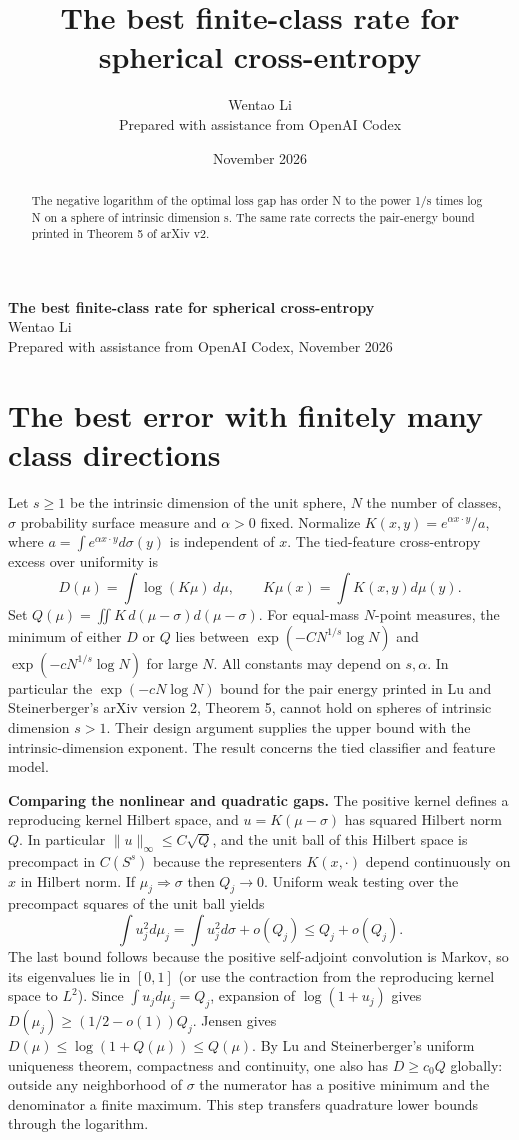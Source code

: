 \documentclass[11pt]{article}
\title{The best finite-class rate for spherical cross-entropy}
\author{Wentao Li\\{\small Prepared with assistance from OpenAI Codex}}
\date{November 2026}
\begin{document}
\begin{center}{\Large\bfseries The best finite-class rate for spherical cross-entropy}\\[3pt]Wentao Li\\{\small Prepared with assistance from OpenAI Codex, November 2026}\end{center}
\begin{abstract}
The negative logarithm of the optimal loss gap has order N to the power 1/s times log N on a sphere of intrinsic dimension s. The same rate corrects the pair-energy bound printed in Theorem 5 of arXiv v2.
\end{abstract}
\section*{The best error with finitely many class directions}
Let $s\ge1$ be the intrinsic dimension of the unit sphere, $N$ the number of classes, $\sigma$ probability surface measure and $\alpha>0$ fixed. Normalize $K(x,y)=e^{\alpha x\cdot y}/a$, where $a=\int e^{\alpha x\cdot y}d\sigma(y)$ is independent of $x$. The tied-feature cross-entropy excess over uniformity is
\[
 D(\mu)=\int\log(K\mu)\,d\mu,\qquad K\mu(x)=\int K(x,y)d\mu(y).
\]
Set $Q(\mu)=\iint K\,d(\mu-\sigma)d(\mu-\sigma)$. For equal-mass $N$-point measures, the minimum of either $D$ or $Q$ lies between $\exp(-C N^{1/s}\log N)$ and $\exp(-c N^{1/s}\log N)$ for large $N$. All constants may depend on $s,\alpha$. In particular the $\exp(-cN\log N)$ bound for the pair energy printed in Lu and Steinerberger's arXiv version 2, Theorem 5, cannot hold on spheres of intrinsic dimension $s>1$. Their design argument supplies the upper bound with the intrinsic-dimension exponent. The result concerns the tied classifier and feature model.

\textbf{Comparing the nonlinear and quadratic gaps.} The positive kernel defines a reproducing kernel Hilbert space, and $u=K(\mu-\sigma)$ has squared Hilbert norm $Q$. In particular $\|u\|_\infty\le C\sqrt Q$, and the unit ball of this Hilbert space is precompact in $C(S^s)$ because the representers $K(x,\cdot)$ depend continuously on $x$ in Hilbert norm. If $\mu_j\Rightarrow\sigma$ then $Q_j\to0$. Uniform weak testing over the precompact squares of the unit ball yields
\[
 \int u_j^2d\mu_j=\int u_j^2d\sigma+o(Q_j)\le Q_j+o(Q_j).
\]
The last bound follows because the positive self-adjoint convolution is Markov, so its eigenvalues lie in $[0,1]$ (or use the contraction from the reproducing kernel space to $L^2$). Since $\int u_jd\mu_j=Q_j$, expansion of $\log(1+u_j)$ gives $D(\mu_j)\ge(1/2-o(1))Q_j$. Jensen gives $D(\mu)\le\log(1+Q(\mu))\le Q(\mu)$. By Lu and Steinerberger's uniform uniqueness theorem, compactness and continuity, one also has $D\ge c_0 Q$ globally: outside any neighborhood of $\sigma$ the numerator has a positive minimum and the denominator a finite maximum. This step transfers quadrature lower bounds through the logarithm.
\end{document}
